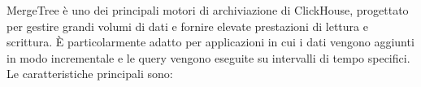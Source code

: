 MergeTree è uno dei principali motori di archiviazione di ClickHouse, progettato per gestire grandi volumi di dati e fornire elevate prestazioni di lettura e scrittura. È particolarmente adatto per applicazioni in cui i dati vengono aggiunti in modo incrementale e le query vengono eseguite su intervalli di tempo specifici.
Le caratteristiche principali sono:
